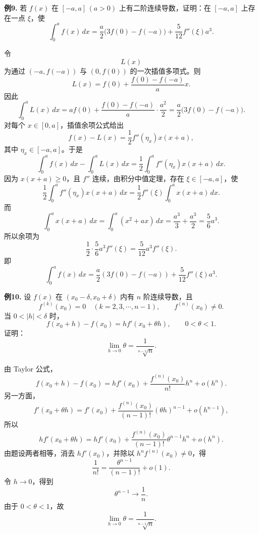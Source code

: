 \begin{problemblock}
\textbf{例9.} 若 \(f(x)\) 在 \([-a,a]\,(a>0)\) 上有二阶连续导数，证明：在 \([-a,a]\) 上存在一点 \(\xi\)，使
\[
\int_0^a f(x)\,dx
=\frac a2\bigl(3f(0)-f(-a)\bigr)
+\frac5{12}f''(\xi)a^3.
\]
\end{problemblock}
\begin{solutionblock}
令
\[
L(x)
\]
为通过 \((-a,f(-a))\) 与 \((0,f(0))\) 的一次插值多项式。则
\[
L(x)=f(0)+\frac{f(0)-f(-a)}{a}x.
\]
因此
\[
\int_0^a L(x)\,dx
=af(0)+\frac{f(0)-f(-a)}{a}\cdot\frac{a^2}{2}
=\frac a2\bigl(3f(0)-f(-a)\bigr).
\]
对每个 \(x\in[0,a]\)，插值余项公式给出
\[
f(x)-L(x)=\frac12 f''(\eta_x)x(x+a),
\]
其中 \(\eta_x\in[-a,a]\)。于是
\[
\int_0^a f(x)\,dx-\int_0^a L(x)\,dx
=\frac12\int_0^a f''(\eta_x)x(x+a)\,dx.
\]
因为 \(x(x+a)\ge0\)，且 \(f''\) 连续，由积分中值定理，存在 \(\xi\in[-a,a]\)，使
\[
\frac12\int_0^a f''(\eta_x)x(x+a)\,dx
=\frac12 f''(\xi)\int_0^a x(x+a)\,dx.
\]
而
\[
\int_0^a x(x+a)\,dx=\int_0^a(x^2+ax)\,dx
=\frac{a^3}{3}+\frac{a^3}{2}
=\frac56a^3.
\]
所以余项为
\[
\frac12\cdot\frac56a^3 f''(\xi)=\frac5{12}a^3f''(\xi).
\]
即
\[
\int_0^a f(x)\,dx
=\frac a2(3f(0)-f(-a))+\frac5{12}f''(\xi)a^3.
\]
\end{solutionblock}

\begin{problemblock}
\textbf{例10.} 设 \(f(x)\) 在 \((x_0-\delta,x_0+\delta)\) 内有 \(n\) 阶连续导数，且
\[
f^{(k)}(x_0)=0\quad(k=2,3,\cdots,n-1),\qquad f^{(n)}(x_0)\ne0.
\]
当 \(0<|h|<\delta\) 时，
\[
f(x_0+h)-f(x_0)=h f'(x_0+\theta h),\qquad 0<\theta<1.
\]
证明：
\[
\lim_{h\to0}\theta=\frac1{\sqrt[n-1]{n}}.
\]
\end{problemblock}
\begin{solutionblock}
由 Taylor 公式，
\[
f(x_0+h)-f(x_0)
=h f'(x_0)+\frac{f^{(n)}(x_0)}{n!}h^n+o(h^n).
\]
另一方面，
\[
f'(x_0+\theta h)
=f'(x_0)+\frac{f^{(n)}(x_0)}{(n-1)!}(\theta h)^{n-1}
+o(h^{n-1}),
\]
所以
\[
h f'(x_0+\theta h)
=h f'(x_0)+\frac{f^{(n)}(x_0)}{(n-1)!}\theta^{n-1}h^n
+o(h^n).
\]
由题设两者相等，消去 \(h f'(x_0)\)，并除以 \(h^n f^{(n)}(x_0)\ne0\)，得
\[
\frac1{n!}
=\frac{\theta^{n-1}}{(n-1)!}+o(1).
\]
令 \(h\to0\)，得到
\[
\theta^{n-1}\to\frac1n.
\]
由于 \(0<\theta<1\)，故
\[
\lim_{h\to0}\theta=\frac1{\sqrt[n-1]{n}}.
\]
\end{solutionblock}

